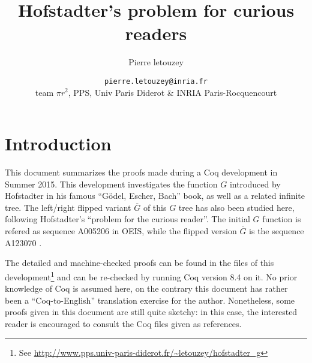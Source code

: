 \documentclass[a4paper,11pt]{article}
\title{Hofstadter's problem for curious readers}
\author{Pierre letouzey}
\date{\small
{\tt pierre.letouzey@inria.fr}\\
team $\pi r^2$, PPS, Univ Paris Diderot \& INRIA Paris-Rocquencourt}
\begin{document}
\newtheorem{theorem}{Theorem}
\newtheorem{definition}{Definition}
\maketitle


\newcommand{\docgen}[2]{\href{http://www.pps.univ-paris-diderot.fr/~letouzey/hofstadter_g/doc/#1.html#2}{\tt #1.v}}
\newcommand{\doc}[1]{\docgen{#1}{}}
\newcommand{\doclab}[2]{\docgen{#1}{\##2}}
\newcommand{\FG}{\ensuremath{\overline{G}}}
\newcommand{\fibrest}{\ensuremath{\Sigma F_i}}

\section{Introduction}
This document summarizes the proofs made during a Coq development in
Summer 2015. This development investigates the function $G$ introduced
by Hofstadter in his famous ``Gödel, Escher, Bach'' book\cite{GEB},
as well as a related infinite tree. The left/right flipped variant
$\FG$ of this $G$ tree has also been studied here, following
Hofstadter's ``problem for the curious reader''.
The initial $G$ function is refered as sequence A005206 in
OEIS\cite{OEIS-G}, while the flipped version $\FG$ is the sequence
A123070 \cite{OEIS-FG}.

The detailed and machine-checked proofs can be found in the files
of this development\footnote{See
\url{http://www.pps.univ-paris-diderot.fr/~letouzey/hofstadter_g}}
and can be re-checked by running Coq \cite{Coq} version 8.4 on it.
No prior knowledge of Coq is assumed here, on the contrary this
document has rather been a ``Coq-to-English'' translation
exercise for the author. Nonetheless, some proofs given in this
document are still quite sketchy: in this case, the interested
reader is encouraged to consult the Coq files given as references.
\end{document}
